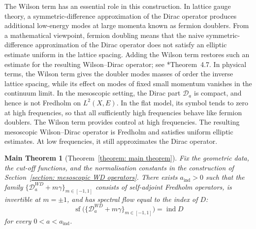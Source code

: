 \documentclass[a4paper,oneside,12pt]{amsart}
\theoremstyle{plain}
\newtheorem*{maintheorem}{Main Theorem}
\theoremstyle{definition}
\theoremstyle{remark}
\DeclareMathOperator{\indexAtiyahSinger}{ind}
\DeclareMathOperator{\spectralflow}{sf}
\newcommand{\mesoscopicDiracoperator}[1][a]{\mathcal{D}_{#1}}
\newcommand{\mesoscopicWilsonDiracoperator}[1][a]{\mathcal{D}_{#1}^{\mathit{WD}}}
\newcommand{\constantAindex}{a_{\mathrm{ind}}}
\begin{document}
The Wilson term has an essential role in this construction.
In lattice gauge theory, a symmetric-difference approximation of the Dirac operator produces additional low-energy modes at large momenta known as fermion doublers.
From a mathematical viewpoint, fermion doubling means that the naive symmetric-difference approximation of the Dirac operator does not satisfy an elliptic estimate uniform in the lattice spacing.
Adding the Wilson term restores such an estimate for the resulting Wilson--Dirac operator; see \cite{MR5076866}*{Theorem~4.7}.
In physical terms, the Wilson term gives the doubler modes masses of order the inverse lattice spacing, while its effect on modes of fixed small momentum vanishes in the continuum limit.
In the mesoscopic setting, the Dirac part $\mesoscopicDiracoperator$ is compact, and hence is not Fredholm on $L^2(X,E)$.
In the flat model, its symbol tends to zero at high frequencies, so that all sufficiently high frequencies behave like fermion doublers.
The Wilson term provides control at high frequencies.
The resulting mesoscopic Wilson--Dirac operator is Fredholm and satisfies uniform elliptic estimates.
At low frequencies, it still approximates the Dirac operator.

\begin{maintheorem}[Theorem~\ref{theorem: main theorem}]
  Fix the geometric data, the cut-off functions, and the normalisation constants in the construction of Section~\ref{section: mesoscopic WD operators}.
  There exists $\constantAindex > 0$ such that the family $\{\mesoscopicWilsonDiracoperator+m\gamma\}_{m\in[-1,1]}$ consists of self-adjoint Fredholm operators, is invertible at $m = \pm 1$, and has spectral flow equal to the index of $D$:
  \begin{equation}
    \spectralflow \bigl(\{\mesoscopicWilsonDiracoperator+m\gamma\}_{m\in[-1,1]}\bigr) = \indexAtiyahSinger D
  \end{equation}
  for every $0 < a < \constantAindex$.
\end{maintheorem}
\end{document}
